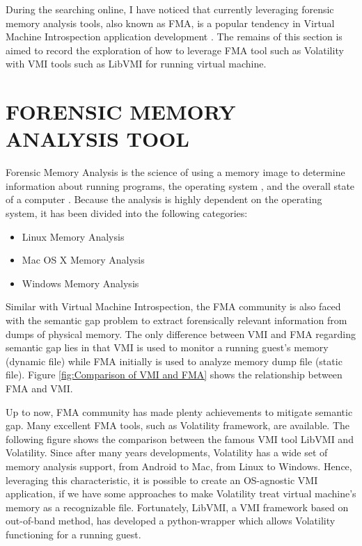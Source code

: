 During the searching online, I have noticed that currently leveraging forensic memory analysis tools, also known as FMA, is 
a popular tendency in Virtual Machine Introspection application development \cite{Reference33}. The remains of this section is 
aimed to record the exploration of how to leverage FMA tool such as Volatility with VMI tools such as LibVMI for running virtual 
machine.

\section{FORENSIC MEMORY ANALYSIS TOOL}
Forensic Memory Analysis is the science of using a memory image to determine information about running programs, the operating system
, and the overall state of a computer \cite{Reference34}. Because the analysis is highly dependent on the operating system, it has 
been divided into the following categories:
\begin{itemize}
    \item Linux Memory Analysis
    \item Mac OS X Memory Analysis
    \item Windows Memory Analysis
\end{itemize}
Similar with Virtual Machine Introspection, the FMA community is also faced with the semantic gap problem to extract 
forensically relevant information from dumps of physical memory. The only difference between VMI and FMA regarding 
semantic gap lies in that VMI is used to monitor a running guest’s memory (dynamic file) while FMA initially is used to 
analyze memory dump file (static file). Figure \ref{fig:Comparison of VMI and FMA} shows the relationship between FMA and VMI.

Up to now, FMA community has made plenty achievements to mitigate semantic gap. Many excellent FMA tools, such as Volatility framework, 
are available. The following figure shows the comparison between the famous VMI tool LibVMI and Volatility. Since after many years 
developments, Volatility has a wide set of memory analysis support, from Android to Mac, from Linux to Windows. Hence, leveraging this 
characteristic, it is possible to create an OS-agnostic VMI application, if we have some approaches to make Volatility treat virtual 
machine’s memory as a recognizable file. Fortunately, LibVMI, a VMI framework based on out-of-band method, has developed a python-wrapper
which allows Volatility functioning for a running guest.

